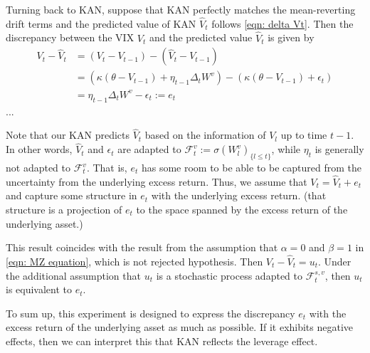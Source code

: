 Turning back to KAN, suppose that KAN perfectly matches the mean-reverting drift terms and the predicted value of KAN $\hat{V}_t$ follows \eqref{eqn: delta Vt}. Then the discrepancy between the VIX $V_t$ and the predicted value $\hat{V}_t$ is given by
\begin{equation}
\begin{aligned}
V_t - \hat{V}_t &= \left(V_t - V_{t-1} \right) - \left(\hat{V}_t - V_{t-1} \right) \\
&= \left( \kappa \left(\theta - V_{t-1} \right) + \eta_{t-1} \Delta_t W^v \right) - \left( \kappa \left(\theta - V_{t-1} \right) + \epsilon_t \right) \\
&= \eta_{t-1} \Delta_t W^v - \epsilon_t := e_t
\end{aligned}
\end{equation}
... %


Note that our KAN predicts $\hat{V}_t$ based on the information of $V_l$ up to time $t-1$.
In other words, $\hat{V}_t$ and $\epsilon_t$ are adapted to $\mathcal{F}^v_t := \sigma (W^v_l )_{\{l\leq t \}}$, while $\eta_t$ is generally not adapted to $\mathcal{F}^v_t$.
That is, $e_t$ has some room to be able to be captured from the uncertainty from the underlying excess return.
Thus, we assume that $V_t = \hat{V}_t + e_t$ and capture some structure in $e_t$ with the underlying excess return. (that structure is a projection of $e_t$ to the space spanned by the excess return of the underlying asset.)



This result coincides with the result from the assumption that $\alpha=0$ and $\beta=1$ in \eqref{eqn: MZ equation}, which is not rejected hypothesis. Then $V_t - \hat{V}_t = u_t$. Under the additional assumption that $u_t$ is a stochastic process adapted to $\mathcal{F}^{s, v}_t$, then $u_t$ is equivalent to $e_t$.

To sum up, this experiment is designed to express the discrepancy $e_t$ with the excess return of the underlying asset as much as possible. If it exhibits negative effects, then we can interpret this that KAN reflects the leverage effect.

